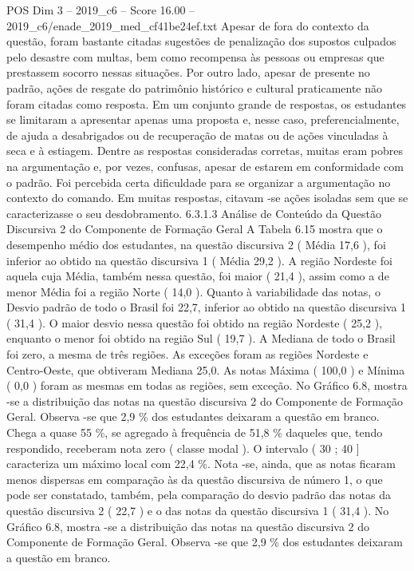 \begin{textsample}{POS Dim 3 – 2019\_c6 – Score 16.00 – 2019\_c6/enade\_2019\_med\_cf41be24ef.txt}
Apesar de fora do contexto da questão, foram bastante citadas sugestões de penalização dos supostos culpados pelo desastre com multas, bem como recompensa às pessoas ou empresas que prestassem socorro nessas situações.
Por outro lado, apesar de presente no padrão, ações de resgate do patrimônio histórico e cultural praticamente não foram citadas como resposta.
Em um conjunto grande de respostas, os estudantes se limitaram a apresentar apenas uma proposta e, nesse caso, preferencialmente, de ajuda a desabrigados ou de recuperação de matas ou de ações vinculadas à seca e à estiagem.
Dentre as respostas consideradas corretas, muitas eram pobres na argumentação e, por vezes, confusas, apesar de estarem em conformidade com o padrão.
Foi percebida certa dificuldade para se organizar a argumentação no contexto do comando.
Em muitas respostas, citavam -se ações isoladas sem que se caracterizasse o seu desdobramento. 6.3.1.3 Análise de Conteúdo da Questão Discursiva 2 do Componente de Formação Geral A Tabela 6.15 mostra que o desempenho médio dos estudantes, na questão discursiva 2 ( Média 17,6 ), foi inferior ao obtido na questão discursiva 1 ( Média 29,2 ).
A região Nordeste foi aquela cuja Média, também nessa questão, foi maior ( 21,4 ), assim como a de menor Média foi a região Norte ( 14,0 ).
Quanto à variabilidade das notas, o Desvio padrão de todo o Brasil foi 22,7, inferior ao obtido na questão discursiva 1 ( 31,4 ).
O maior desvio nessa questão foi obtido na região Nordeste ( 25,2 ), enquanto o menor foi obtido na região Sul ( 19,7 ).
A Mediana de todo o Brasil foi zero, a mesma de três regiões.
As exceções foram as regiões Nordeste e Centro-Oeste, que obtiveram Mediana 25,0.
As notas Máxima ( 100,0 ) e Mínima ( 0,0 ) foram as mesmas em todas as regiões, sem exceção.
No Gráfico 6.8, mostra -se a distribuição das notas na questão discursiva 2 do Componente de Formação Geral.
Observa -se que 2,9 \% dos estudantes deixaram a questão em branco.
Chega a quase 55 \%, se agregado à frequência de 51,8 \% daqueles que, tendo respondido, receberam nota zero ( classe modal ).
O intervalo ( 30 ; 40 ] caracteriza um máximo local com 22,4 \%.
Nota -se, ainda, que as notas ficaram menos dispersas em comparação às da questão discursiva de número 1, o que pode ser constatado, também, pela comparação do desvio padrão das notas da questão discursiva 2 ( 22,7 ) e o das notas da questão discursiva 1 ( 31,4 ).
No Gráfico 6.8, mostra -se a distribuição das notas na questão discursiva 2 do Componente de Formação Geral.
Observa -se que 2,9 \% dos estudantes deixaram a questão em branco.

\end{textsample}
